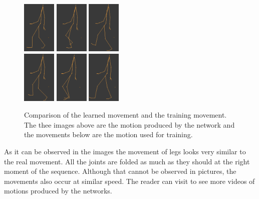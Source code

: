 \documentclass[letterpaper,9pt]{article}
\begin{document}
\begin{figure}[h!]
  \centering
  \includegraphics[width=60px]{Extra/out_simple_walk_1.png}
  \includegraphics[width=60px]{Extra/out_simple_walk_2.png}
  \includegraphics[width=60px]{Extra/out_simple_walk_3.png}\\
  \includegraphics[width=60px]{Extra/teach_simple_walk_1.png}
  \includegraphics[width=60px]{Extra/teach_simple_walk_2.png}
  \includegraphics[width=60px]{Extra/teach_simple_walk_3.png}
    \caption[Simple Walk]{Comparison of the learned movement and the training movement. The thee images above are the motion produced by the network and the movements below are the motion used for training.}
\end{figure}

As it can be observed in the images the movement of legs looks very similar to the real movement. All the joints are folded as much as they should at the right moment of the sequence. Although that cannot be observed in pictures, the movements also occur at similar speed. The reader can visit \cite{LambdaNN} to see more videos of motions produced by the networks.
\end{document}
